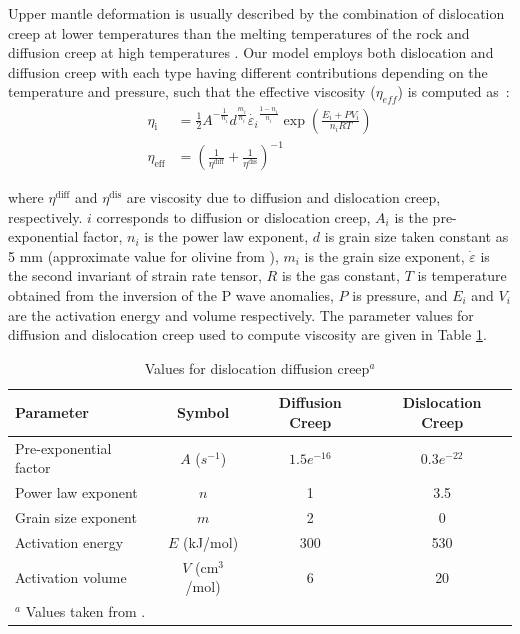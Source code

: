 \documentclass[draft,linenumbers]{agujournal2018}
\begin{document}
    Upper mantle deformation is usually described by the combination of dislocation creep at lower temperatures than the melting temperatures of the rock and diffusion creep at high temperatures \citep{gordon1967thermally}. Our model employs both dislocation and diffusion creep with each type having different contributions depending on the temperature and pressure, such that the effective viscosity ($\eta_{eff}$) is computed as~\citep{billen2007rheologic}:
%
\begin{align}
    \eta_{\text{i}} &= \frac{1}{2} A^{-\frac{1}{n_i}} d^\frac{m_i}{n_i} \dot{\varepsilon_i}^{\frac{1-n_i}{n_i}} \exp\left(\frac{E_i + PV_i}{n_iRT}\right) \\
    \eta_{\text{eff}} &= \left(\frac{1}{\eta^\text{diff}} + \frac{1}{\eta^\text{dis}}\right)^{-1}
\end{align}

where $\eta^\text{diff}$ and $\eta^\text{dis}$ are viscosity due to diffusion and dislocation creep, respectively. $i$ corresponds to diffusion or dislocation creep, $A_i$ is the pre-exponential factor, $n_i$ is the power law exponent, $d$ is grain size taken constant as 5 mm (approximate value for olivine from \citet{karato1984grain} ), $m_i$ is the grain size exponent, $\dot{\varepsilon}$ is the second invariant of strain rate tensor, $R$ is the gas constant, $T$ is temperature obtained from the inversion of the P wave anomalies, $P$ is pressure, and $E_i$ and $V_i$ are the activation energy and volume respectively. The parameter values for diffusion and dislocation creep used to compute viscosity are given in Table \ref{table_model}.
%
\begin{table} \label{table_model}
    \caption{Values for dislocation diffusion creep$^a$}
    \centering
    \begin{tabular}{l c c c}
    \hline
     Parameter  & Symbol & Diffusion Creep & Dislocation Creep  \\
    \hline
      Pre-exponential factor & $A$ ($s^{-1}$) & $1.5e^{-16}$ & $0.3e^{-22}$   \\
      Power law exponent & $n$ & 1 & 3.5  \\
      Grain size exponent  & $m$ & 2 & 0   \\
      Activation energy  & $E$ (kJ/mol) & 300 & 530   \\
      Activation volume  & $V$ (cm$^3$/mol) & 6 & 20 \\
    \hline
    \multicolumn{2}{l}{$^{a}$ Values taken from \citet{karato1993rheology}.}
    \end{tabular}
\end{table}
\end{document}
